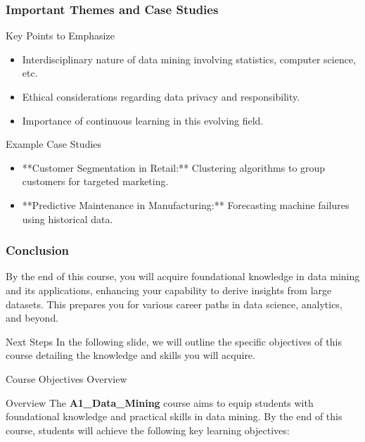 \documentclass[aspectratio=169]{beamer}
\begin{document}
\begin{frame}[fragile]
  \frametitle{Important Themes and Case Studies}

  \begin{block}{Key Points to Emphasize}
    \begin{itemize}
        \item Interdisciplinary nature of data mining involving statistics, computer science, etc.
        \item Ethical considerations regarding data privacy and responsibility.
        \item Importance of continuous learning in this evolving field.
    \end{itemize}
  \end{block}

  \begin{block}{Example Case Studies}
    \begin{itemize}
        \item **Customer Segmentation in Retail:** Clustering algorithms to group customers for targeted marketing.
        \item **Predictive Maintenance in Manufacturing:** Forecasting machine failures using historical data.
    \end{itemize}
  \end{block}
\end{frame}

\begin{frame}[fragile]
  \frametitle{Conclusion}
  
  By the end of this course, you will acquire foundational knowledge in data mining and its applications, enhancing your capability to derive insights from large datasets. This prepares you for various career paths in data science, analytics, and beyond.

  \begin{block}{Next Steps}
    In the following slide, we will outline the specific objectives of this course detailing the knowledge and skills you will acquire.
  \end{block}
\end{frame}

\begin{frame}[fragile]{Course Objectives Overview}
    \begin{block}{Overview}
        The \textbf{A1\_Data\_Mining} course aims to equip students with foundational knowledge and practical skills in data mining. By the end of this course, students will achieve the following key learning objectives:
    \end{block}
\end{frame}
\end{document}
